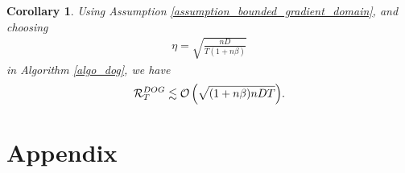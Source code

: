 \documentclass{article}
\newtheorem{Corollary}{\bf{Corollary}}
\begin{document}
\begin{Corollary}
Using Assumption \ref{assumption_bounded_gradient_domain}, and choosing 
\begin{align}
\nonumber
\eta = \sqrt{\frac{nD}{T(1+n\beta)}}
\end{align} in Algorithm \ref{algo_dog}, we have
\begin{align}
\nonumber
{\mathcal{R}}_T^{DOG} \lesssim {\mathcal{O}\left( \sqrt{ (1+n\beta)nDT }  \right)}.
\end{align}






\end{Corollary}








\section*{Appendix}
\end{document}
